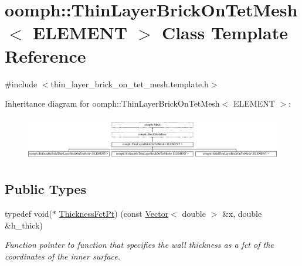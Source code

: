 \hypertarget{classoomph_1_1ThinLayerBrickOnTetMesh}{}\section{oomph\+:\+:Thin\+Layer\+Brick\+On\+Tet\+Mesh$<$ E\+L\+E\+M\+E\+NT $>$ Class Template Reference}
\label{classoomph_1_1ThinLayerBrickOnTetMesh}


{\ttfamily \#include $<$thin\+\_\+layer\+\_\+brick\+\_\+on\+\_\+tet\+\_\+mesh.\+template.\+h$>$}

Inheritance diagram for oomph\+:\+:Thin\+Layer\+Brick\+On\+Tet\+Mesh$<$ E\+L\+E\+M\+E\+NT $>$\+:\begin{figure}[H]
\begin{center}
\leavevmode
\includegraphics[height=1.944445cm]{classoomph_1_1ThinLayerBrickOnTetMesh}
\end{center}
\end{figure}
\subsection*{Public Types}
\begin{DoxyCompactItemize}
\item 
typedef void($\ast$ \hyperlink{classoomph_1_1ThinLayerBrickOnTetMesh_aed34f7d1e9a5c6b5f3e220cb5bdf4550}{Thickness\+Fct\+Pt}) (const \hyperlink{classoomph_1_1Vector}{Vector}$<$ double $>$ \&x, double \&h\+\_\+thick)
\begin{DoxyCompactList}\small\item\em Function pointer to function that specifies the wall thickness as a fct of the coordinates of the inner surface. \end{DoxyCompactList}\end{DoxyCompactItemize}
